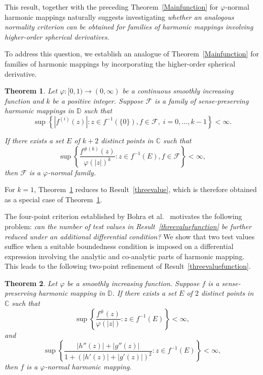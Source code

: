 \documentclass[10pt,a4paper]{amsart}
\numberwithin{equation}{section}
\newtheorem{theorem}{Theorem}[section]
\begin{document}
This result, together with the preceding Theorem~\ref{Mainfunction} for
$\varphi$-normal harmonic mappings 
 naturally suggests investigating {\it whether an analogous
normality criterion can be obtained for families of harmonic mappings 
involving higher-order spherical derivatives.}
\smallskip

To address this question, we establish an analogue of 
Theorem~\ref{Mainfunction} for families of harmonic mappings
by incorporating the higher-order spherical derivative.

\begin{theorem}\label{mainfamily}
Let $\varphi:[0,1)\to(0,\infty)$ be a continuous smoothly increasing
function and $k$ be a positive integer. Suppose $\mathcal{F}$
 is a family of sense-preserving harmonic
mappings in $\mathbb{D}$ such that
\begin{equation}\label{eq:1mainfamily}
\sup\left\{
|f^{(i)}(z)|:
z\in f^{-1}(\{0\}), f\in \mathcal{F},\;
i=0,\ldots,k-1
\right\}<\infty.
\end{equation}

If there exists a set $E$ of $k+2$ distinct 
points in $\mathbb{C}$ such that
\begin{equation}\label{eq:2mainfamily}
\sup\left\{
\frac{f^{\#(k)}(z)}{\varphi(|z|)^k}
:
z\in f^{-1}(E), f\in \mathcal{F}
\right\}
<\infty,
\end{equation}
then $\mathcal{F}$ is a $\varphi$-normal family.
\end{theorem}
 \medskip
For $k=1$, Theorem~\ref{mainfamily} reduces to 
Result~\ref{threevalue}, which is therefore obtained  
as a special case of Theorem~\ref{mainfamily}.
\smallskip

The four-point criterion established by Bohra et al.~\cite[Theorem 1.6]{Bohra}
motivates the following problem: {\it can the number 
of test values in Result~\ref{threevaluefunction}
 be further reduced under an additional differential condition?}
 We show that two test values suffice when a suitable boundedness
condition is imposed on a differential expression involving the analytic 
and co-analytic parts of harmonic mapping. This leads to the
following two-point refinement of Result~\ref{threevaluefunction}.
\begin{theorem}\label{twovaluefunction}
  Let $\varphi$ be a smoothly increasing function. 
  Suppose $f$ is a 
   sense-preserving harmonic mapping in $\mathbb{D}$.
    If there exists a set $E$ of $2$ 
   distinct points in $\mathbb{C}$ such that
\begin{equation}\label{eq:1twovaluefunction}
\sup\left\{
\frac{f^\#(z)}{\varphi(|z|)}
:
z\in f^{-1}(E)
\right\}
<\infty,
\end{equation}
and
\begin{equation}\label{eq:2twovaluefunction}
\sup\left\{
\frac{|h''(z)|+|g''(z)|}
{1+\left(|h'(z)|+|g'(z)|\right)^2}
:
z\in f^{-1}(E)
\right\}
<\infty,
\end{equation}
then $f$ is a $\varphi$-normal harmonic mapping.
\end{theorem}
\end{document}
